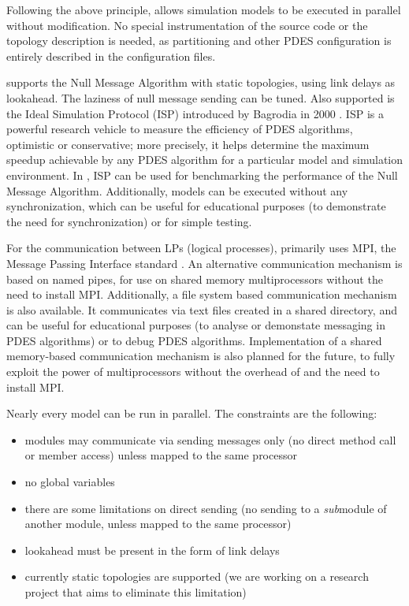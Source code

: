 Following the above principle, {\opp} allows simulation models
to be executed in parallel without modification. No special instrumentation
of the source code or the topology description is needed,
as partitioning and other PDES configuration is entirely described
in the configuration files.

{\opp} supports the Null Message Algorithm with static
topologies, using link delays as lookahead. The laziness of null message
sending can be tuned. Also supported is the Ideal Simulation Protocol
(ISP) introduced by Bagrodia in 2000 \cite{bagrodia00}. ISP is
a powerful research vehicle to measure the efficiency of
PDES algorithms, optimistic or conservative;
more precisely, it helps determine the maximum speedup achievable
by any PDES algorithm for a particular model and simulation environment.
In {\opp}, ISP can be used for benchmarking the performance of the
Null Message Algorithm.
Additionally, models can be executed without any synchronization, which
can be useful for educational purposes (to demonstrate the need for
synchronization) or for simple testing.

For the communication between LPs (logical processes), {\opp}
primarily uses MPI, the Message Passing Interface standard
\cite{mpiforum94}.  An alternative communication mechanism is based on
named pipes, for use on shared memory multiprocessors without the need
to install MPI.  Additionally, a file system based communication mechanism
is also available. It communicates via text files created in a shared
directory, and can be useful for educational purposes (to analyse or
demonstate messaging in PDES algorithms) or to debug PDES algorithms.
Implementation of a shared memory-based communication mechanism is also planned
for the future, to fully exploit the power of multiprocessors without
the overhead of and the need to install MPI.

Nearly every model can be run in parallel. The constraints are the following:
\begin{itemize}
  \item{modules may communicate via sending messages only (no direct method call
        or member access) unless mapped to the same processor}
  \item{no global variables}
  \item{there are some limitations on direct sending (no sending to a \textit{sub}module
        of another module, unless mapped to the same processor)}
  \item{lookahead must be present in the form of link delays}
  \item{currently static topologies are supported (we are working on a
      research project that aims to eliminate this limitation)}
\end{itemize}

